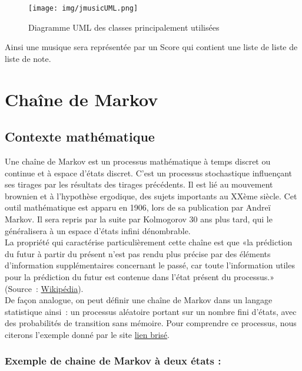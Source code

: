 \documentclass[12pt, a4paper]{article}
\begin{document}
        \begin{figure}[h]
            \center
            \texttt{[image: img/jmusicUML.png]}
            \caption{Diagramme UML des classes principalement utilisées}
        \end{figure}
        
        Ainsi une musique sera représentée par un Score qui contient une liste de liste de liste de note.
    
    
    \section{Chaîne de Markov}
        \subsection{Contexte mathématique}
            Une chaîne de Markov est un processus mathématique à temps discret ou continue et à espace d’états discret. C’est un processus stochastique influençant ses tirages par les résultats des tirages précédents. Il est lié au mouvement brownien et à l’hypothèse ergodique, des sujets importants au XXème siècle. Cet outil mathématique est apparu en 1906, lors de sa publication par Andreï Markov. Il sera repris par la suite par Kolmogorov 30 ans plus tard, qui le généralisera à un espace d’états infini dénombrable.\\
        
            La propriété qui caractérise particulièrement cette chaîne est que «la prédiction du futur à partir du présent n’est pas rendu plus précise par des éléments d’information supplémentaires concernant le passé, car toute l’information utiles pour la prédiction du futur est contenue dans l’état présent du processus.» (Source : \href{https://fr.wikipedia.org/wiki/Chaine_de_Markov}{Wikipédia}). \\
        
            De façon analogue, on peut définir une chaîne de Markov dans un langage statistique ainsi : un processus aléatoire portant sur un nombre fini d’états, avec des probabilités de transition sans mémoire. Pour comprendre ce processus, nous citerons l’exemple donné par le site \href{http://benhur.teluq.ca}{lien brisé}.\\
        
            \subsubsection*{Exemple de chaine de Markov à deux états :}
        
\end{document}
